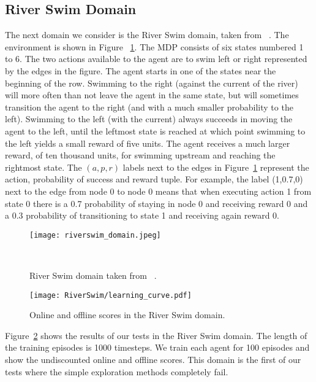 \subsection{River Swim Domain }
The next domain we consider is the River Swim domain, taken from ~\cite{Strehl2008AnAO}. The environment is shown in Figure ~\ref{fig:riverswim_domain}. The MDP consists of six states numbered 1 to 6. The two actions available to the agent are to swim left or right represented by the edges in the figure. The agent starts in one of the states near the beginning of the row. Swimming to the right (against the current of the river) will more often than not leave the agent in the same state, but will sometimes transition the agent to the right (and with a much smaller probability to the left). Swimming to the left (with the current) always succeeds in moving the agent to the left, until the leftmost state is reached at which point swimming to the left yields a small reward of five units. The agent receives a much larger reward, of ten thousand units, for swimming upstream and reaching the rightmost state. The $(a,p,r)$ labels next to the edges in Figure~\ref{fig:riverswim_domain} represent the action, probability of success and reward tuple. For example, the label (1,0.7,0) next to the edge from node 0 to node 0 means that when executing action 1 from state 0 there is a 0.7 probability of staying in node 0 and receiving reward 0 and a 0.3 probability of transitioning to state 1 and receiving again reward 0.\par
\begin{figure}
 \texttt{[image: riverswim\_domain.jpeg]}
 \caption{River Swim domain taken from ~\cite{Strehl2008AnAO}.} ~
 \label{fig:riverswim_domain}
\end{figure}
\begin{figure}
 \texttt{[image: RiverSwim/learning\_curve.pdf]}
 \caption{Online and offline scores in the River Swim domain.}
 \label{fig:riverswim_learning_curve}
\end{figure}
Figure~\ref{fig:riverswim_learning_curve} shows the results of our tests in the River Swim domain. The length of the training episodes is 1000 timesteps. We train each agent for 100 episodes and show the undiscounted online and offline scores. This domain is the first of our tests where the simple exploration methods completely fail. \par
